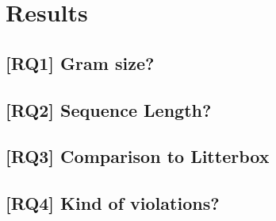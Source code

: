 \chapter{Results}\label{chap:results}

\section{[RQ1] Gram size?}\label{sec:gram_size}

\section{[RQ2] Sequence Length?}\label{sec:sequence_length}

\section{[RQ3] Comparison to Litterbox}\label{sec:litterbox}

\section{[RQ4] Kind of violations?}\label{sec:violations}


